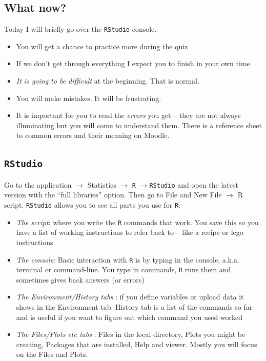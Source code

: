 \documentclass[
]{gitbook}
\providecommand{\tightlist}{%
  \setlength{\itemsep}{0pt}\setlength{\parskip}{0pt}}
\begin{document}
\hypertarget{what-now}{%
\subsection{What now?}\label{what-now}}

Today I will briefly go over the \texttt{RStudio} console.

\begin{itemize}
\tightlist
\item
  You will get a chance to practice more during the quiz
\item
  If we don't get through everything I expect you to finish in your own time
\item
  \emph{It is going to be difficult} at the beginning. That is normal.
\item
  You will make mistakes. It will be frustrating.
\item
  It is important for you to read the \emph{errors} you get -- they are not always illuminating but you will come to understand them. There is a reference sheet to common errors and their meaning on Moodle.
\end{itemize}

\hypertarget{rstudio-1}{%
\subsection{\texorpdfstring{\texttt{RStudio}}{RStudio}}\label{rstudio-1}}

Go to the application \(\rightarrow\) Statistics \(\rightarrow\) \texttt{R} \(\rightarrow\)\texttt{RStudio} and open the latest version with the ``full libraries'' option. Then go to File and New File \(\rightarrow\) R script. \texttt{RStudio} allows you to see all parts you use for \texttt{R}:

\begin{itemize}
\tightlist
\item
  \emph{The script}: where you write the \texttt{R} commands that work. You save this so you have a list of working instructions to refer back to -- like a recipe or lego instructions
\item
  \emph{The console}: Basic interaction with \texttt{R} is by typing in the console, a.k.a. terminal or command-line. You type in commands, \texttt{R} runs them and sometimes gives back answers (or errors)
\item
  \emph{The Environment/History tabs} : if you define variables or upload data it shows in the Environment tab. History tab is a list of the commands so far and is useful if you want to figure out which command you used worked
\item
  \emph{The Files/Plots etc tabs} : Files in the local directory, Plots you might be creating, Packages that are installed, Help and viewer. Mostly you will focus on the Files and Plots.
\end{itemize}
\end{document}
